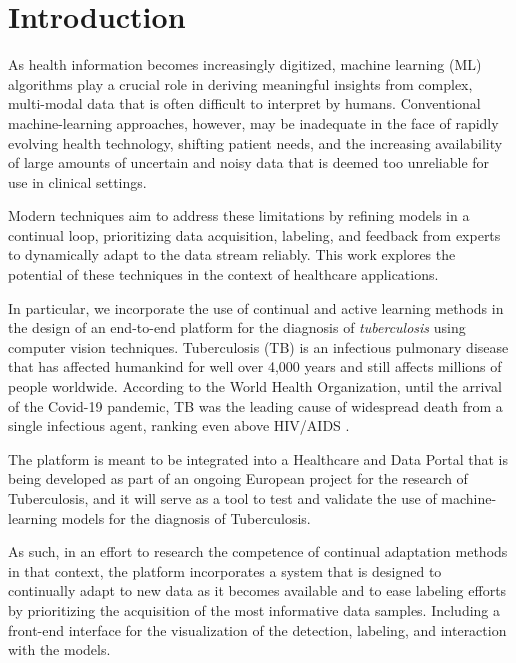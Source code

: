 \documentclass[../main.tex]{subfiles}
\begin{document}
\chapter{Introduction}
\label{chap:intro}

 As health information becomes increasingly digitized, machine learning (ML) algorithms play a crucial role in deriving meaningful insights from complex, multi-modal data that is often difficult to interpret by humans. 
 Conventional machine-learning approaches, however, may be inadequate in the face of rapidly evolving health technology, shifting patient needs, and the increasing availability of large amounts of uncertain and noisy data that is deemed too unreliable for use in clinical settings.

 Modern techniques aim to address these limitations by refining models in a continual loop, prioritizing data acquisition, labeling, and feedback from experts to dynamically adapt to the data stream reliably. This work explores the potential of these techniques in the context of healthcare applications.
 
 In particular, we incorporate the use of continual and active learning methods in the design of an end-to-end platform for the diagnosis of \textit{tuberculosis} using computer vision techniques. Tuberculosis (TB) is an infectious pulmonary disease that has affected humankind for well over 4,000 years \cite{cdctb_world_2023} and still affects millions of people worldwide. According to the World Health Organization, until the arrival of the Covid-19 pandemic, TB was the leading cause of widespread death from a single infectious agent, ranking even above HIV/AIDS \cite{who_global_2022}.

 The platform is meant to be integrated into a Healthcare and Data Portal that is being developed as part of an ongoing European project for the research of Tuberculosis, and it will serve as a tool to test and validate the use of machine-learning models for the diagnosis of Tuberculosis. 

 As such, in an effort to research the competence of continual adaptation methods in that context, the platform incorporates a system that is designed to continually adapt to new data as it becomes available and to ease labeling efforts by prioritizing the acquisition of the most informative data samples. Including a front-end interface for the visualization of the detection, labeling, and interaction with the models.
 
\end{document}
